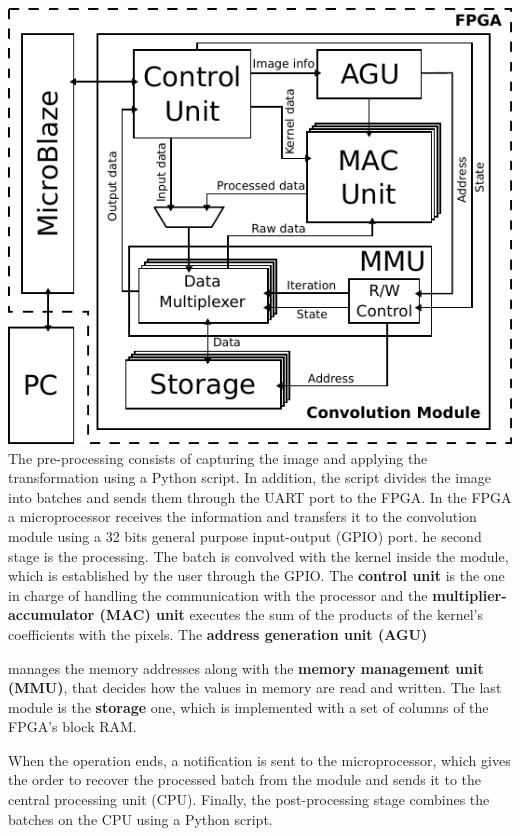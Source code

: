 \documentclass[a1paper,portrait,fontscale=0.43]{baposter}
\begin{document}
\begin{poster}
{%

\begin{multicols}{2}
    \includegraphics[width=\linewidth]{general}
\vfill\null
\columnbreak
The pre-processing consists of capturing the image and applying
the transformation using a Python script. In addition, the script divides the
image into batches and sends them through the UART port to the FPGA.  In the FPGA a microprocessor receives the
information and transfers it to the convolution module using a 32 bits general
purpose input-output (GPIO) port. 
he second stage is the processing. The batch is convolved with the kernel inside
the module, which is established by the user through the GPIO.
The \textbf{control unit} is the one in charge of handling the communication with
the processor and the \textbf{multiplier-accumulator (MAC) unit} executes the sum
of the products of the kernel's coefficients with the pixels. The \textbf{address generation unit (AGU)}
\end{multicols}
manages the memory addresses along with
the \textbf{memory management unit (MMU)}, that decides how the values in memory
are read and written.
The last module is the \textbf{storage} one, which is
implemented with a set of columns of the FPGA's block RAM. 

When the operation ends, a notification is sent to the microprocessor,
which gives the order to recover the processed batch from the module and sends it
to the central processing unit (CPU). Finally, the post-processing stage combines
the batches on the CPU using a Python script.
}


\end{poster}
\end{document}
